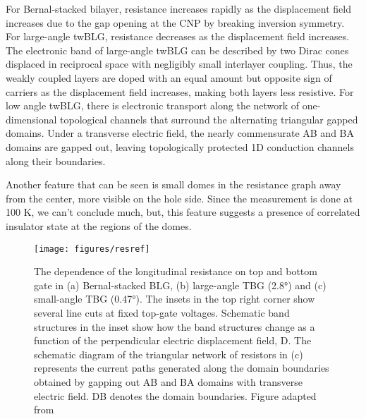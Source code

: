 For Bernal-stacked bilayer, resistance increases rapidly as the displacement field increases due to the gap opening at the CNP by breaking inversion symmetry. For large-angle twBLG, resistance decreases as the displacement field increases. The electronic band of large-angle twBLG can be described by two Dirac cones displaced in reciprocal space with negligibly small interlayer coupling. Thus, the weakly coupled layers are doped with an equal amount but opposite sign of carriers as the displacement field increases, making both layers less resistive. For low angle twBLG, there is electronic transport along the network of one-dimensional topological channels that surround the alternating triangular gapped domains. Under a transverse electric field, the nearly commensurate AB and BA domains are gapped out, leaving topologically protected 1D conduction channels along their boundaries. \cite{Yoo2019}

Another feature that can be seen is small domes in the resistance graph away from the center, more visible on the hole side. Since the measurement is done at 100 K, we can't conclude much, but, this feature suggests a presence of correlated insulator state at the regions of the domes.
\begin{figure}[H]
	\centering
	\texttt{[image: figures/resref]}
	\caption{The dependence of the longitudinal resistance  on top and bottom gate in (a) Bernal-stacked BLG, (b) large-angle TBG (2.8°) and (c) small-angle TBG (0.47°). The insets in the top right corner show several line cuts at fixed top-gate voltages. Schematic band structures in the inset show how the band structures change as a function of the perpendicular electric displacement field, D. The schematic diagram of the triangular network of resistors in (c) represents the current paths generated along the domain boundaries obtained by gapping out AB and BA domains with transverse electric field. DB denotes the domain boundaries. Figure adapted from \cite{Yoo2019}}
	\label{fig:resref}
\end{figure}